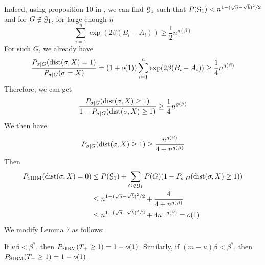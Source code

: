 \documentclass{article}
\begin{document}
Indeed, using proposition 10 in \cite{ye2020exact}, we can find $\mathcal{G}_1$ such that $P(\mathcal{G}_1) < n^{1-(\sqrt{a} - \sqrt{b})^2/2}$
and for $G\not\in \mathcal{G}_1$, for large enough $n$
$$
\sum_{i=1}^n \exp(2\beta(B_i - A_i)) \geq \frac{1}{2}n^{g(\beta)}
$$
For such $G$, we already have
$$
\frac{P_{\sigma | G}(\operatorname{dist}(\sigma, X) = 1)}{P_{\sigma | G}(\sigma = X)} = (1+o(1))\sum_{i=1}^n \exp(2\beta(B_i - A_i)) \geq \frac{1}{4}n^{g(\beta)}
$$
Therefore, we can get
$$
\frac{P_{\sigma | G}(\operatorname{dist}(\sigma, X) \geq 1)}{1-P_{\sigma | G}(\operatorname{dist}(\sigma, X)\geq 1)}\geq \frac{1}{4}n^{g(\beta)}
$$
We then have
$$
P_{\sigma | G}(\operatorname{dist}(\sigma, X) \geq 1) \geq \frac{n^{g(\beta)}}{4+n^{g(\beta)}}
$$
Then
\begin{align*}
P_{\operatorname{SIBM}}(\operatorname{dist}(\sigma, X) = 0) & \leq P(\mathcal{G}_1) + \sum_{G\not\in \mathcal{G}_1}P(G)(1-P_{\sigma|G}(\operatorname{dist}(\sigma, X)\geq 1))\\
& \leq n^{1-(\sqrt{a} - \sqrt{b})^2/2} + \frac{4}{4+n^{g(\beta)}} \\
& \leq n^{1-(\sqrt{a} - \sqrt{b})^2/2} + 4n^{-g(\beta)} = o(1)
\end{align*}
We modify Lemma 7 as follows:
\begin{lemma}
If $u\beta < \beta^*$, then $P_{\operatorname{SIBM}}(T_+ \geq 1) = 1-o(1)$.
Similarly, if $(m-u)\beta < \beta^*$, then $P_{\operatorname{SIBM}}(T_- \geq 1) = 1-o(1)$.
\end{lemma}
\end{document}
